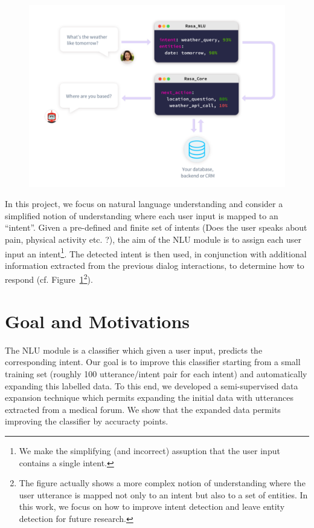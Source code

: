 \documentclass[11pt]{article}
\begin{document}
\begin{figure}[htbp]
\begin{center}
\includegraphics[width=.9\textwidth]{img/rasa.pdf}
\end{center}
\caption{}
\label{fig:rasa}
\end{figure}
In this project, we focus on natural language understanding and
consider a simplified notion of understanding where each user input is
mapped to an ``intent''. Given a pre-defined and finite set of intents
(Does the user speaks about pain, physical activity etc. ?), the aim
of the NLU module is to assign each user input an intent\footnote{We
  make the simplifying (and incorrect) assuption that the user input
  contains a single intent.}. The detected intent is then used, in
conjunction with additional information extracted from the previous
dialog interactions, to determine how to
respond (cf. Figure~\ref{fig:rasa}\footnote{The figure
  actually shows a more complex notion of understanding where the user
  utterance is mapped not only to an intent but also to a set of
  entities. In this work, we focus on how to improve intent detection
  and leave entity detection for future research.}).

\section{Goal and Motivations}
\label{sec:goals}


The NLU module is a classifier which given a user input, predicts the
corresponding intent. Our goal is to improve this classifier starting
from a small training set (roughly 100 utterance/intent pair for each
intent) and automatically expanding this labelled data. To this
end, we developed a semi-supervised data expansion technique which
permits expanding the initial data with utterances extracted from a
medical forum. We show that the expanded data permits improving the
classifier by  accuracty points.
\end{document}
